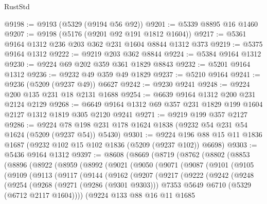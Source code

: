 \begin{lexlean}{RustStd}
\begin{coremodule}
@9198 := @9193 (@5329 (@9194 @56 @92))
@9201 := @5339 @8895 @16 @1460
@9207 := @9198 (@5176 (@9201 @92 @191 @1812 @1604))
@9217 := @5361 @9164 @1312 @236 @203 @362 @231 @1604 @8844 @1312 @373
@9219 := @5375 @9164 @1312
@9222 := @9219 @203 @362 @8844
@9224 := @5384 @9164 @1312
@9230 := @9224 @69 @202 @359 @361 @1829 @8843
@9232 := @5201 @9164 @1312
@9236 := @9232 @49 @359 @49 @1829
@9237 := @5210 @9164
@9241 := @9236 (@5209 (@9237 @49)) @6627
@9242 := @9230 @9241
@9248 := @9224 @200 @135 @231 @18 @2131 @1688
@9254 := @6639 @9164 @1312 @200 @231 @2124 @2129
@9268 := @6649 @9164 @1312 @69 @357 @231 @1829 @199 @1604 @2127 @1312 @1819 @305 @2120 @9241
@9271 := @9219 @199 @357 @2127
@9286 := @9224 @78 @198 @231 @178 @1624 @1838 (@9232 @54 @231 @54 @1624 (@5209 (@9237 @54)) @5430)
@9301 := @9224 @196 @88 @15 @11 @1836 @1687 (@9232 @102 @15 @102 @1836 (@5209 (@9237 @102)) @6698)
@9303 := @5436 @9164 @1312
@9397 := @8608
    (@8669
      (@8719
        (@8762
          (@8802
            (@8853
              (@8896
                (@8922
                  (@8959
                    (@8992
                      (@9021
                        (@9050
                          (@9071
                            (@9087
                              (@9101
                                (@9105
                                  (@9109
                                    (@9113
                                      (@9117
                                        (@9144
                                          (@9162
                                            (@9207
                                              (@9217
                                                (@9222
                                                  (@9242
                                                    (@9248
                                                      (@9254
                                                        (@9268
                                                          (@9271 (@9286 (@9301 @9303)))
                                                          @7353
                                                          @5649
                                                          @6710
                                                          (@5329 (@6712 @2117 @1604))))
                                                      (@9224
                                                        @133
                                                        @88
                                                        @16
                                                        @11
                                                        @1685

\end{coremodule}
\end{lexlean}
